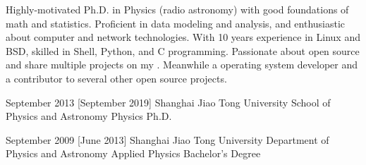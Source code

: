 \documentclass{resume}
\begin{document}
\makeheader

Highly-motivated Ph.D. in Physics (radio astronomy)
with good foundations of math and statistics.
Proficient in data modeling and analysis,
and enthusiastic about computer and network technologies.
With 10 years experience in Linux and BSD,
skilled in Shell, Python, and C programming.
Passionate about open source and share multiple projects on my
.
Meanwhile a 
operating system developer and a contributor to several other
open source projects.

\begin{competences}[10em]
\end{competences}

\begin{educations}
  \education%
  {September 2013}%
  [September 2019]%
  {Shanghai Jiao Tong University}%
  {School of Physics and Astronomy}%
  {Physics}%
  {Ph.D.}

  \separator{0.5ex}
  \education%
  {September 2009}%
  [June 2013]%
  {Shanghai Jiao Tong University}%
  {Department of Physics and Astronomy}%
  {Applied Physics}%
  {Bachelor's Degree}
\end{educations}
\end{document}
